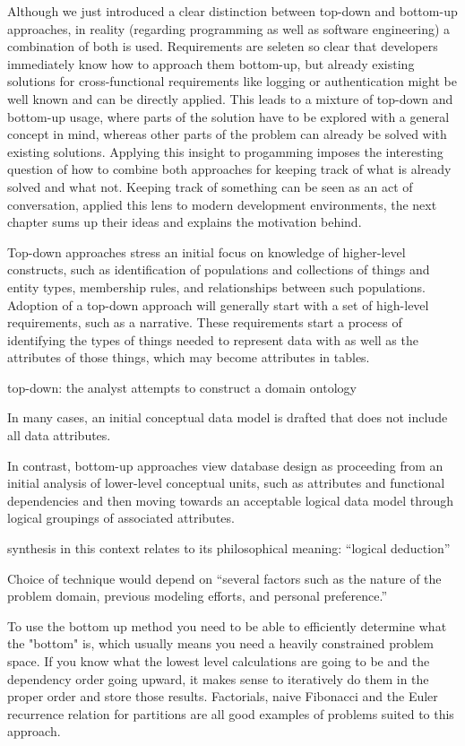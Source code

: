 %
Although we just introduced a clear distinction between top-down and bottom-up approaches, in reality (regarding programming as well as software engineering) a combination of both is used.
Requirements are seleten so clear that developers immediately know how to approach them bottom-up, but already existing solutions for cross-functional requirements like logging or authentication might be well known and can be directly applied.
This leads to a mixture of top-down and bottom-up usage, where parts of the solution have to be explored with a general concept in mind, whereas other parts of the problem can already be solved with existing solutions.
Applying this insight to progamming imposes the interesting question of how to combine both approaches for keeping track of what is already solved and what not.
Keeping track of something can be seen as an act of conversation, \citeauthor{mccabe_towards_2023} applied this lens to modern development environments, the next chapter sums up their ideas and explains the motivation behind.


\cite{kung_comparing_2013}
Top-down approaches stress an initial focus on knowledge of higher-level constructs, such as identification of populations and collections of things and entity types, membership rules, and relationships between such populations. Adoption of a top-down approach will generally start with a set of high-level requirements, such as a narrative. These requirements start a process of identifying the types of things needed to represent data with as well as the attributes of those things, which may become attributes in tables.

top-down: the analyst attempts to construct a domain ontology

In many cases, an initial conceptual data model is drafted that does not include all data attributes.

In contrast, bottom-up approaches view database design as proceeding from an initial analysis of lower-level conceptual units, such as attributes and functional dependencies and then moving towards an acceptable logical data model through logical groupings of associated attributes.

synthesis in this context relates to its philosophical meaning: “logical deduction”

Choice of technique would depend on “several factors such as the nature of the problem domain, previous modeling efforts, and personal preference.”

\cite{jones_answer_2011}
To use the bottom up method you need to be able to efficiently determine what the "bottom" is, which usually means you need a heavily constrained problem space. If you know what the lowest level calculations are going to be and the dependency order going upward, it makes sense to iteratively do them in the proper order and store those results. Factorials, naive Fibonacci and the Euler recurrence relation for partitions are all good examples of problems suited to this approach.

